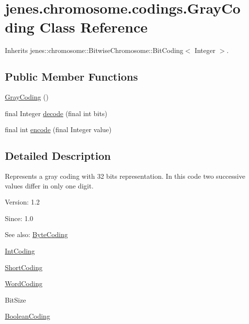 \hypertarget{classjenes_1_1chromosome_1_1codings_1_1_gray_coding}{
\section{jenes.chromosome.codings.GrayCoding Class Reference}
\label{classjenes_1_1chromosome_1_1codings_1_1_gray_coding}
}
Inherits jenes::chromosome::BitwiseChromosome::BitCoding$<$ Integer $>$.

\subsection*{Public Member Functions}
\begin{CompactItemize}
\item 
\hyperlink{classjenes_1_1chromosome_1_1codings_1_1_gray_coding_55dedef21f32baa6e10eec066fc549ba}{GrayCoding} ()
\item 
final Integer \hyperlink{classjenes_1_1chromosome_1_1codings_1_1_gray_coding_b18b4f8ca1b0bed9242254405fde897e}{decode} (final int bits)
\item 
final int \hyperlink{classjenes_1_1chromosome_1_1codings_1_1_gray_coding_b25d7513076e67bdd6aa15d9797673c0}{encode} (final Integer value)
\end{CompactItemize}


\subsection{Detailed Description}
Represents a gray coding with 32 bits representation. In this code two successive values differ in only one digit.

\begin{Desc}
\item[Version:]1.2 \end{Desc}
\begin{Desc}
\item[Since:]1.0\end{Desc}
\begin{Desc}
\item[See also:]\hyperlink{classjenes_1_1chromosome_1_1codings_1_1_byte_coding}{ByteCoding} 

\hyperlink{classjenes_1_1chromosome_1_1codings_1_1_int_coding}{IntCoding} 

\hyperlink{classjenes_1_1chromosome_1_1codings_1_1_short_coding}{ShortCoding} 

\hyperlink{classjenes_1_1chromosome_1_1codings_1_1_word_coding}{WordCoding} 

BitSize 

\hyperlink{classjenes_1_1chromosome_1_1codings_1_1_boolean_coding}{BooleanCoding} \end{Desc}


